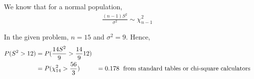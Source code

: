 \documentclass[../../probability-notes.tex]{subfiles}
\begin{document}
    We know that for a normal population,
    \begin{align*}
        \frac{(n-1)S^{2}}{\sigma^{2}} \sim \chi_{n-1}^{2}
    \end{align*}
    
    In the given problem, $n = 15$ and $\sigma^{2} = 9$. Hence,
    \begin{align*}
        P(S^{2} > 12) &= P(\frac{14 S^{2}}{9} > \frac{14}{9} 12)\\
        &= P(\chi_{14}^{2} > \frac{56}{3})
        &= 0.178 \text{\; from standard tables or chi-square calculators}
    \end{align*}
\end{document}

